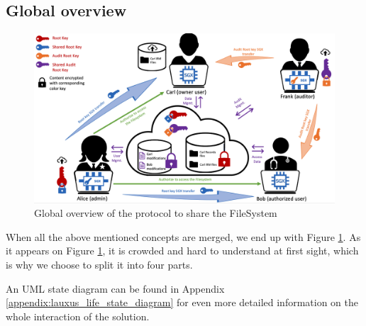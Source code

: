 \documentclass[../main.tex]{subfiles}
\begin{document}
\subsection{Global overview}
\label{section:lauxus:approach_global}
\begin{figure}[h]
    \centering
    \includegraphics[width=\textwidth]{images/lauxus/approach_global}
    
    \caption{Global overview of the protocol to share the FileSystem}
    \label{figure:lauxus:approach_global}
\end{figure}
\par When all the above mentioned concepts are merged, we end up with Figure \ref{figure:lauxus:approach_global}. As it appears on Figure \ref{figure:lauxus:approach_global}, it is crowded and hard to understand at first sight, which is why we choose to split it into four parts.
\par An UML state diagram can be found in Appendix \ref{appendix:lauxus_life_state_diagram} for even more detailed information on the whole interaction of the solution.
\end{document}

